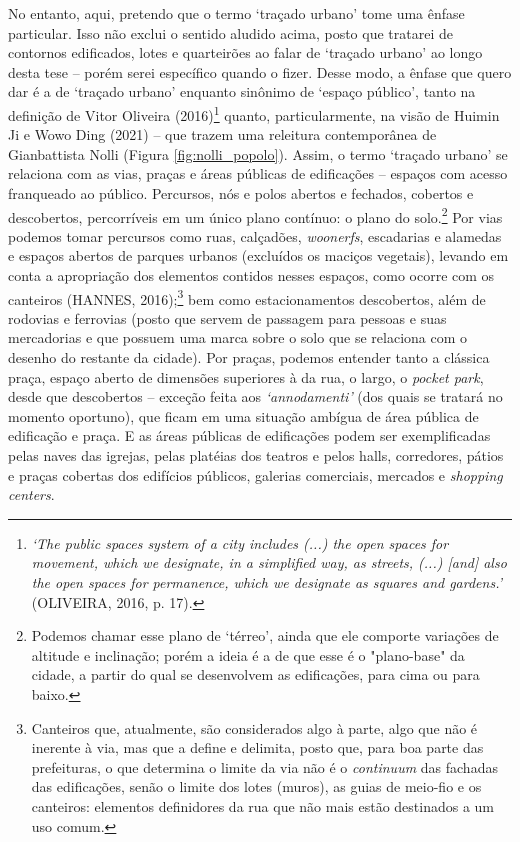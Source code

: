 \documentclass[]{report}
\begin{document}
No entanto, aqui, pretendo que o termo `traçado urbano' tome uma ênfase particular. Isso não exclui o sentido aludido acima, posto que tratarei de contornos edificados, lotes e quarteirões ao falar de `traçado urbano' ao longo desta tese – porém serei específico quando o fizer. Desse modo, a ênfase que quero dar é a de `traçado urbano' enquanto sinônimo de `espaço público', tanto na definição de Vitor Oliveira (2016)\footnote[8]{\textit{`The public spaces system of a city includes (...) the open spaces for movement, which we designate, in a simplified way, as streets, (...) [and] also the open spaces for permanence, which we designate as squares and gardens.'} (OLIVEIRA, 2016, p. 17).} quanto, particularmente, na visão de Huimin Ji e Wowo Ding (2021) – que trazem uma releitura contemporânea de Gianbattista Nolli (Figura \ref{fig:nolli_popolo}). Assim, o termo `traçado urbano' se relaciona com as vias, praças e áreas públicas de edificações – espaços com acesso franqueado ao público. Percursos, nós e polos abertos e fechados, cobertos e descobertos, percorríveis em um único plano contínuo: o plano do solo.\footnote[9]{Podemos chamar esse plano de `térreo', ainda que ele comporte variações de altitude e inclinação; porém a ideia é a de que esse é o "plano-base" da cidade, a partir do qual se desenvolvem as edificações, para cima ou para baixo.} Por vias podemos tomar percursos como ruas, calçadões, \textit{woonerfs}, escadarias e alamedas e espaços abertos de parques urbanos (excluídos os maciços vegetais), levando em conta a apropriação dos elementos contidos nesses espaços, como ocorre com os canteiros (HANNES, 2016);\footnote[10]{Canteiros que, atualmente, são considerados algo à parte, algo que não é inerente à via, mas que a define e delimita, posto que, para boa parte das prefeituras, o que determina o limite da via não é o \textit{continuum} das fachadas das edificações, senão o limite dos lotes (muros), as guias de meio-fio e os canteiros: elementos definidores da rua que não mais estão destinados a um uso comum.} bem como estacionamentos descobertos, além de rodovias e ferrovias (posto que servem de passagem para pessoas e suas mercadorias e que possuem uma marca sobre o solo que se relaciona com o desenho do restante da cidade). Por praças, podemos entender tanto a clássica praça, espaço aberto de dimensões superiores à da rua, o largo, o \textit{pocket park}, desde que descobertos – exceção feita aos \textit{`annodamenti'} (dos quais se tratará no momento oportuno), que ficam em uma situação ambígua de área pública de edificação e praça. E as áreas públicas de edificações podem ser exemplificadas pelas naves das igrejas, pelas platéias dos teatros e pelos halls, corredores, pátios e praças cobertas dos  edifícios públicos, galerias comerciais, mercados e \textit{shopping centers}.
\end{document}

